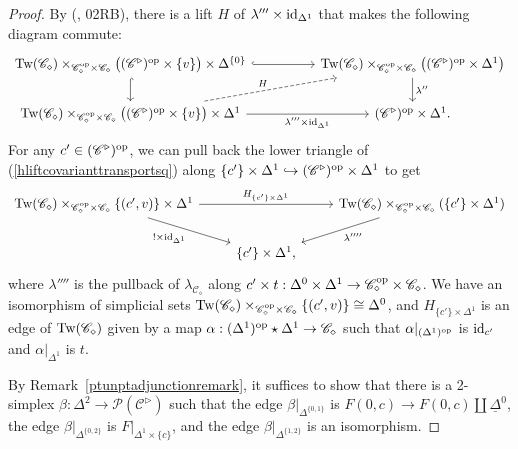 \documentclass{tac}
\newcommand{\s}[1]{\mathscr{#1}}
\newcommand{\tx}[1]{\textnormal{#1}}
\newcommand{\ul}[1]{\underline{#1}}
\begin{document}
\begin{proof}
By (\cite{kerodon}, 02RB), there is a lift $H$ of $\lambda''' \times \tx{id}_{\Delta^1}$ that makes the following diagram commute:
\begin{equation}\label{hliftcovarianttransportsq} \begin{tikzcd}
 \tx{Tw}(\s{C}_\diamond )\times_{\s{C}_\diamond^\tx{op} \times \s{C}_\diamond} \big( (\s{C}^\triangleright )^\tx{op} \times \{ v\} \big) \times \Delta^{\{0\} } \arrow[hook]{rr} \arrow[hook]{d} & & \tx{Tw}(\s{C}_\diamond )\times_{\s{C}_\diamond^\tx{op} \times \s{C}_\diamond} \big( (\s{C}^\triangleright )^\tx{op} \times \Delta^1 \big) \arrow[]{d}{\lambda''} \\
 \tx{Tw}(\s{C}_\diamond )\times_{\s{C}_\diamond^\tx{op} \times \s{C}_\diamond} \big( (\s{C}^\triangleright )^\tx{op} \times \{ v\} \big) \times \Delta^1 \arrow[]{rr}[swap]{\lambda''' \times \tx{id}_{\Delta^1}} \arrow[dashed]{urr}{H} & & (\s{C}^\triangleright )^\tx{op} \times \Delta^1 .
\end{tikzcd}\end{equation}
For any $c' \in (\s{C}^\triangleright )^{\tx{op}}$, we can pull back the lower triangle of (\ref{hliftcovarianttransportsq}) along $\{ c'\} \times \Delta^1 \hookrightarrow (\s{C}^\triangleright )^\tx{op} \times \Delta^1$ to get
\[\begin{tikzcd}
\tx{Tw}(\s{C}_\diamond ) \times_{\s{C}_\diamond^\tx{op} \times \s{C}_\diamond } \{ (c' , v) \} \times \Delta^1 \arrow[]{rr}{H_{\{c' \} \times \Delta^1}} \arrow[]{dr}[swap]{! \times \tx{id}_{\Delta^1}} & & \tx{Tw}(\s{C}_\diamond ) \times_{\s{C}_\diamond^{\tx{op}} \times \s{C}_\diamond } (\{ c' \} \times \Delta^1 ) \arrow[]{dl}{\lambda''''} \\
 & \{ c'\} \times\Delta^1 , &
\end{tikzcd}\]
where $\lambda''''$ is the pullback of $\lambda_{\s{C}_\diamond}$ along $c' \times t : \Delta^0 \times \Delta^1 \to \s{C}_\diamond^{\tx{op}} \times \s{C}_\diamond $.  We have an isomorphism of simplicial sets $\tx{Tw}(\s{C}_\diamond ) \times_{\s{C}_\diamond^\tx{op} \times \s{C}_\diamond } \{ (c' , v) \} \cong \Delta^0$, and $H_{\{c' \} \times \Delta^1}$ is an edge of $\tx{Tw}(\s{C}_\diamond )$ given by a map $\alpha : (\Delta^1 )^\tx{op} \star \Delta^1 \to \s{C}_{\diamond }$ such that $\alpha |_{(\Delta^1 )^\tx{op}}$ is $\tx{id}_{c'}$ and $\alpha |_{\Delta^1 }$ is $t$.

\hfill

By Remark~\ref{ptunptadjunctionremark}, it suffices to show that there is a 2-simplex $\beta : \Delta^2 \to \s{P}(\s{C}^\triangleright )$ such that the edge $\beta|_{\Delta^{\{0,1 \}}}$ is $F(0,c) \to F(0,c) \coprod \ul{\Delta}^0$, the edge $\beta|_{\Delta^{\{0,2 \}}}$ is $F|_{\Delta^1 \times \{ c\}}$, and the edge $\beta|_{\Delta^{\{1,2 \}}}$ is an isomorphism.  


\end{proof}
\end{document}
